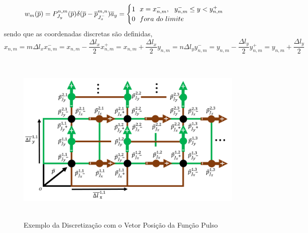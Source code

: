 \documentclass[
	12pt,				%
	openright,			%
	oneside,			%
	a4paper,			%
	english,			%
	brazil				%
	]{abntex2}
\begin{document}
\begin{apendicesenv}
\begin{equation}{\label{FunçaoTesteJx}}
     w_{m}(\overline{p})= P_{J_y}^{n,m}(\overline{p})\delta(\overline{p}-\overline{p}^{{m,n}}_{J^{-}_x})\overline{a}_y =
       \begin{cases}
      1 \ \ x=x_{n,m}^{-}, \ \ y_{n,m}^{-} \leq y < y_{n,m}^{+}  \\
      0 \ \ fora \ do \ limite \\
    \end{cases}  
 \end{equation}
sendo que as coordenadas discretas são definidas, 
 \begin{subequations}
    \begin{equation}
    x_{n,m}=m{\Delta l}_x
\end{equation}
    \begin{equation}
    x^{-}_{n,m}=x_{n,m}-\frac{{\Delta l}_x}{2}
\end{equation}
  \begin{equation}
    x^{+}_{n,m}=x_{n,m}+\frac{{\Delta l}_x}{2}
\end{equation}
      \begin{equation}
    y_{n,m}=n{\Delta l}_y
\end{equation}
  \begin{equation}
    y^{-}_{n,m}=y_{n,m}-\frac{{\Delta l}_y}{2}
\end{equation}
  \begin{equation}
    y^{+}_{n,m}=y_{n,m}+\frac{{\Delta l}_y}{2}
\end{equation}
\end{subequations}

\begin{figure}[htb]
 \label{PulsosVetorPosicaoIlustracao}
 \centering
  \begin{minipage}{\textwidth}
    \centering
    \caption{Exemplo da Discretização com o Vetor Posição da Função Pulso} \label{fig_minipage_imagem2}
    \includegraphics[width=14cm, height=8.5cm]{figures/PulsosVetorPosicaoIlustracao.png}
  \end{minipage}
  \hfill


\end{figure}
\end{apendicesenv}
\end{document}
